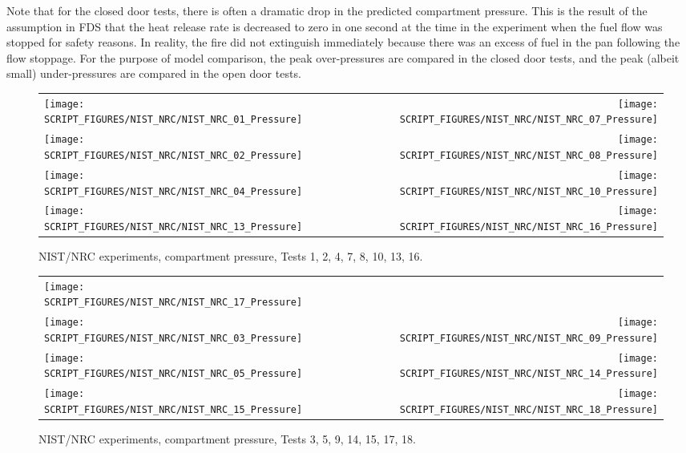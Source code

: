 Note that for the closed door tests, there is often a dramatic drop in the predicted compartment pressure. This is the result of the assumption in FDS that the heat release rate is decreased to zero in one second at the time in the experiment when the fuel flow was stopped for safety reasons.  In reality, the fire did not extinguish immediately because there was an excess of fuel in the pan following the flow stoppage. For the purpose of model comparison, the peak over-pressures are compared in the closed door tests, and the peak (albeit small) under-pressures are compared in the open door tests.

\newpage

\begin{figure}[p]
\begin{tabular*}{\textwidth}{l@{\extracolsep{\fill}}r}
\texttt{[image: SCRIPT\_FIGURES/NIST\_NRC/NIST\_NRC\_01\_Pressure]} &
\texttt{[image: SCRIPT\_FIGURES/NIST\_NRC/NIST\_NRC\_07\_Pressure]} \\
\texttt{[image: SCRIPT\_FIGURES/NIST\_NRC/NIST\_NRC\_02\_Pressure]} &
\texttt{[image: SCRIPT\_FIGURES/NIST\_NRC/NIST\_NRC\_08\_Pressure]} \\
\texttt{[image: SCRIPT\_FIGURES/NIST\_NRC/NIST\_NRC\_04\_Pressure]} &
\texttt{[image: SCRIPT\_FIGURES/NIST\_NRC/NIST\_NRC\_10\_Pressure]} \\
\texttt{[image: SCRIPT\_FIGURES/NIST\_NRC/NIST\_NRC\_13\_Pressure]} &
\texttt{[image: SCRIPT\_FIGURES/NIST\_NRC/NIST\_NRC\_16\_Pressure]}
\end{tabular*}
\caption[NIST/NRC experiments, compartment pressure, Tests 1, 2, 4, 7, 8, 10, 13, 16]{NIST/NRC experiments, compartment pressure, Tests 1, 2, 4, 7, 8, 10, 13, 16.}
\label{NIST_NRC_Pressure_Closed}
\end{figure}

\begin{figure}[p]
\begin{tabular*}{\textwidth}{l@{\extracolsep{\fill}}r}
\texttt{[image: SCRIPT\_FIGURES/NIST\_NRC/NIST\_NRC\_17\_Pressure]} &
   \\
\texttt{[image: SCRIPT\_FIGURES/NIST\_NRC/NIST\_NRC\_03\_Pressure]} &
\texttt{[image: SCRIPT\_FIGURES/NIST\_NRC/NIST\_NRC\_09\_Pressure]} \\
\texttt{[image: SCRIPT\_FIGURES/NIST\_NRC/NIST\_NRC\_05\_Pressure]} &
\texttt{[image: SCRIPT\_FIGURES/NIST\_NRC/NIST\_NRC\_14\_Pressure]} \\
\texttt{[image: SCRIPT\_FIGURES/NIST\_NRC/NIST\_NRC\_15\_Pressure]} &
\texttt{[image: SCRIPT\_FIGURES/NIST\_NRC/NIST\_NRC\_18\_Pressure]}
\end{tabular*}
\caption[NIST/NRC experiments, compartment pressure, Tests 3, 5, 9, 14, 15, 17, 18]{NIST/NRC experiments, compartment pressure, Tests 3, 5, 9, 14, 15, 17, 18.}
\label{NIST_NRC_Pressure_Open}
\end{figure}


